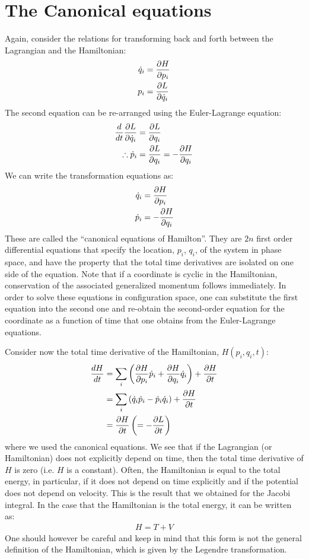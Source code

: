 \section{The Canonical equations}
Again, consider the relations for transforming back and forth between the Lagrangian and the Hamiltonian:
\begin{align}
\dot q_i&=\frac{\partial H}{\partial p_i} \nonumber\\
p_i &= \frac{\partial L}{\partial \dot q_i} 
\end{align}
The second equation can be re-arranged using the Euler-Lagrange equation:
\begin{align}
\frac{d}{dt}\frac{\partial L}{\partial \dot q_i}&=\frac{\partial L}{\partial q_i}\nonumber\\
\therefore \dot p_i&=\frac{\partial L}{\partial q_i}= -\frac{\partial H}{\partial q_i}
\end{align}
We can write the transformation equations as:
\begin{align}
\dot q_i&=\frac{\partial H}{\partial p_i} \nonumber\\
\dot p_i &= -\frac{\partial H}{\partial q_i}
\end{align}
These are called the ``canonical equations of Hamilton''. They are $2n$ first order differential equations that specify the location, $p_i$, $q_i$, of the system in phase space, and have the property that the total time derivatives are isolated on one side of the equation. Note that if a coordinate is cyclic in the Hamiltonian, conservation of the associated generalized momentum follows immediately. In order to solve these equations in configuration space, one can substitute the first equation into the second one and re-obtain the second-order equation for the coordinate as a function of time that one obtains from the Euler-Lagrange equations.

Consider now the total time derivative of the Hamiltonian, $H(p_i,q_i,t)$:
\begin{align}
\frac{dH}{dt}&= \sum_i\left(\frac{\partial H}{\partial p_i}\dot p_i +\frac{\partial H}{\partial q_i}\dot q_i  \right)+\frac{\partial H}{\partial t}\nonumber\\
&= \sum_i\left(\dot q_i\dot p_i -\dot p_i\dot q_i  \right)+\frac{\partial H}{\partial t}\nonumber\\
&= \frac{\partial H}{\partial t} \left(=-\frac{\partial L}{\partial t}\right)
\end{align}
where we used the canonical equations. We see that if the Lagrangian (or Hamiltonian) does not explicitly depend on time, then the total time derivative of $H$ is zero (i.e. $H$ is a constant). Often, the Hamiltonian is equal to the total energy, in particular, if it does not depend on time explicitly and if the potential does not depend on velocity. This is the result that we obtained for the Jacobi integral. In the case that the Hamiltonian is the total energy, it can be written as:
\begin{align}
H=T+V
\end{align}
One should however be careful and keep in mind that this form is not the general definition of the Hamiltonian, which is given by the Legendre transformation.


